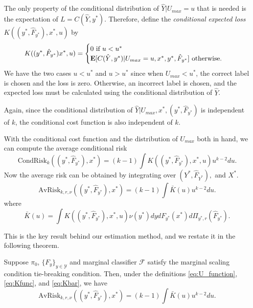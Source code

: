 \documentclass[12pt]{article}
\begin{document}
The only property of the conditional distribution of $\hat{Y}|U_{max} = u$ that is needed is
the expectation of $L = C(\hat{Y}, y^*)$.  Therefore, define the \emph{conditional expected loss} $K((y^*, \hat{F}_{y^*}), x^*, u)$ by
\begin{equation}\label{eq:Kfunc}
K((y^*, \hat{F}_{y^*}) x^*, u) = \begin{cases} 0 \text{ if } u < u^*\\
\textbf{E}[C(\hat{Y}, y^*)|U_{max} = u, x^*, y^*, \hat{F}_{y^*}] \text{ otherwise.}
\end{cases}
\end{equation}
We have the two cases $u < u^*$ and $u > u^*$ since when $U_{max} <
u^*$, the correct label is chosen and the loss is zero.  Otherwise, an
incorrect label is chosen, and the expected loss must be calculated
using the conditional distribution of $\hat{Y}$.

Again, since the conditional distribution of $\hat{Y}|U_{max}, x^*,
(y^*, \hat{F}_{y^*})$ is independent of $k$, the conditional cost
function is also independent of $k$.

With the conditional cost function and the distribution of $U_{max}$ both in hand, we can compute the average conditional risk
\[
\text{CondRisk}_k((y^*, \hat{F}_{y^*}), x^*) = (k-1) \int K((y^*,\hat{F}_{y^*}), x^*, u) u^{k-2} du.
\]
Now the average risk can be obtained by integrating over $(Y^*, \hat{F}_{Y^*}),$ and $X^*$.
\[
\text{AvRisk}_{k, r, \nu}((y^*, \hat{F}_{y^*}), x^*) = (k-1) \int \bar{K}(u) u^{k-2} du.
\]
where
\begin{equation}\label{eq:Kbar}
\bar{K}(u) = \int K((y^*,\hat{F}_{y^*}), x^*, u) \nu(y^*)dy dF_{y^*}(x^*) d\Pi_{y^*, r}(\hat{F}_{y^*}).
\end{equation}


This is the key result behind our estimation method, and we restate it
in the following theorem.

\begin{theorem}\label{theorem:avrisk_identity}
Suppose $\pi_0$, $\{F_y\}_{y \in \mathcal{Y}}$ and marginal classifier
$\mathcal{F}$ satisfy the marginal scaling condition tie-breaking
condition.  Then, under the
definitions \eqref{eq:U_function}, \eqref{eq:Kfunc},
and \eqref{eq:Kbar}, we have
\begin{equation}\label{eq:avrisk_identity}
\text{AvRisk}_{k, r, \nu}((y^*, \hat{F}_{y^*}), x^*) = (k-1) \int \bar{K}(u) u^{k-2} du.
\end{equation}
\end{theorem}
\end{document}
